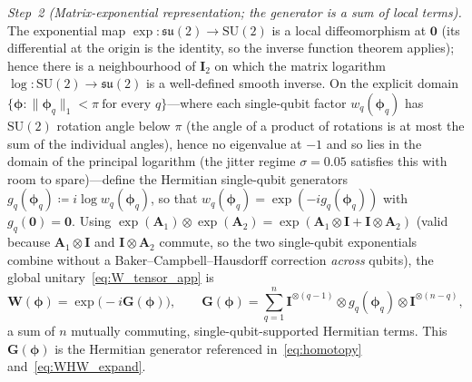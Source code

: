 \documentclass[11pt]{article}
\newcommand{\SU}{\mathrm{SU}}
\newcommand{\su}{\mathfrak{su}}
\theoremstyle{plain}
\theoremstyle{plain}
\begin{document}
\emph{Step~2 (Matrix-exponential representation; the generator is a sum
of local terms).}
The exponential map $\exp:\su(2)\to\SU(2)$ is a local diffeomorphism at
$\bm0$ (its differential at the origin is the identity, so the inverse
function theorem applies); hence there is a neighbourhood of $\mathbf{I}_2$ on
which the matrix logarithm $\log:\SU(2)\to\su(2)$ is a well-defined
smooth inverse.  On the explicit domain
$\{\bm\phi:\|\bm\phi_q\|_1<\pi\ \text{for every }q\}$---where each
single-qubit factor $w_q(\bm\phi_q)$ has $\SU(2)$ rotation angle below
$\pi$ (the angle of a product of rotations is at most the sum of the
individual angles), hence no eigenvalue at $-1$ and so lies in the domain
of the principal logarithm (the jitter regime $\sigma=0.05$ satisfies this
with room to spare)---define the Hermitian single-qubit generators
$g_q(\bm\phi_q)\coloneqq i\log w_q(\bm\phi_q)$,
so that $w_q(\bm\phi_q)=\exp(-i g_q(\bm\phi_q))$ with
$g_q(\bm 0)=\mathbf{0}$.  Using
$\exp(\mathbf{A}_1)\otimes\exp(\mathbf{A}_2)=\exp(\mathbf{A}_1\otimes\mathbf{I}+\mathbf{I}\otimes\mathbf{A}_2)$
(valid because $\mathbf{A}_1\otimes\mathbf{I}$ and $\mathbf{I}\otimes\mathbf{A}_2$ commute, so the
two single-qubit exponentials combine without a
Baker--Campbell--Hausdorff correction \emph{across} qubits), the global
unitary~\eqref{eq:W_tensor_app} is
\begin{equation}\label{eq:W_global_exp}
  \mathbf{W}(\bm\phi)=\exp\bigl(-i \mathbf{G}(\bm\phi)\bigr),
  \qquad
  \mathbf{G}(\bm\phi)=\sum_{q=1}^n
    \mathbf{I}^{\otimes(q-1)}\otimes g_q(\bm\phi_q)\otimes\mathbf{I}^{\otimes(n-q)} ,
\end{equation}
a sum of $n$ mutually commuting, single-qubit-supported Hermitian
terms.  This $\mathbf{G}(\bm\phi)$ is the Hermitian generator referenced
in~\eqref{eq:homotopy} and~\eqref{eq:WHW_expand}.
\end{document}

